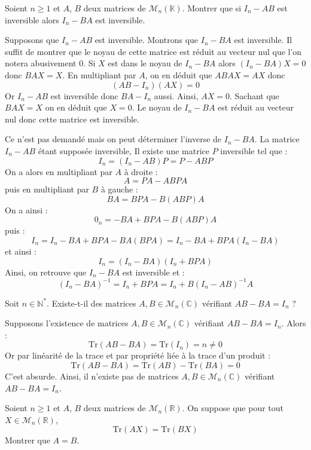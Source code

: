 \documentclass[a4paper,10pt]{report}
\begin{document}
\begin{Exa} Soient $n\geq 1$ et $A$, $B$ deux matrices de $\mathcal{M}_n(\mathbb{K})$. Montrer que si $I_n - AB$ est inversible alors $I_n - BA$ est inversible.
\end{Exa} 

\corr Supposons que $I_n -AB$ est inversible. Montrons que $I_n-BA$ est inversible. Il suffit de montrer que le noyau de cette matrice est réduit au vecteur nul que l'on notera abusivement $0$. Si $X$ est dans le noyau de $I_n-BA$ alors $(I_n- BA)X=0$ donc $BAX=X$. En multipliant par $A$, on en déduit que $ABAX=AX$ donc 
$$ (AB-I_n)(AX)=0$$
Or $I_n -AB$ est inversible donc $BA-I_n$ aussi. Ainsi, $AX=0$. Sachant que $BAX=X$ on en déduit que $X=0$. Le noyau de $I_n-BA$ est réduit au vecteur nul donc cette matrice est inversible.

\medskip

\noindent Ce n'est pas demandé mais on peut déterminer l'inverse de $I_n-BA$. La matrice $I_n-AB$ étant supposée inversible, Il existe une matrice $P$ inversible tel que :
$$ I_n= (I_n-AB)P = P- ABP$$
On a alors en multipliant par $A$ à droite : 
$$ A = PA-ABPA$$
puis en multipliant par $B$ à gauche :
$$ BA = BPA- B(ABP)A$$
On a ainsi :
$$ 0_n = -BA + BPA- B(ABP)A$$
puis :
$$ I_n = I_n - BA +BPA - BA(BPA) = I_n - BA + BPA(I_n- BA)$$
et ainsi :
$$ I_n = (I_n-BA)(I_n+BPA)$$
Ainsi, on retrouve que $I_n-BA$ est inversible et :
$$ (I_n-BA)^{-1} = I_n+BPA = I_n+B(I_n-AB)^{-1}A$$


\begin{Exa} Soit $n \in \mathbb{N}^*$. Existe-t-il des matrices $A,B \in \mathcal{M}_n(\mathbb{C})$ vérifiant $AB - BA = I_n$ ?
\end{Exa}

\corr Supposons l'existence de matrices $A,B \in \mathcal{M}_n(\mathbb{C})$ vérifiant $AB - BA = I_n$. Alors :
$$ \textrm{Tr}(AB-BA) = \textrm{Tr}(I_n) = n \neq 0$$
Or par linéarité de la trace et par propriété liée à la trace d'un produit :
$$  \textrm{Tr}(AB-BA) =  \textrm{Tr}(AB)- \textrm{Tr}(BA) = 0$$
C'est absurde. Ainsi, il n'existe pas de matrices $A,B \in \mathcal{M}_n(\mathbb{C})$ vérifiant $AB - BA = I_n$.

\begin{Exa} Soient $n \geq 1$ et $A$, $B$ deux matrices de $\mathcal{M}_n(\mathbb{R})$. On suppose que pour tout $X \in \mathcal{M}_n(\mathbb{R})$, 
$$\textrm{Tr}(AX)= \textrm{Tr}(BX)$$
Montrer que $A=B$.
\end{Exa}
\end{document}
